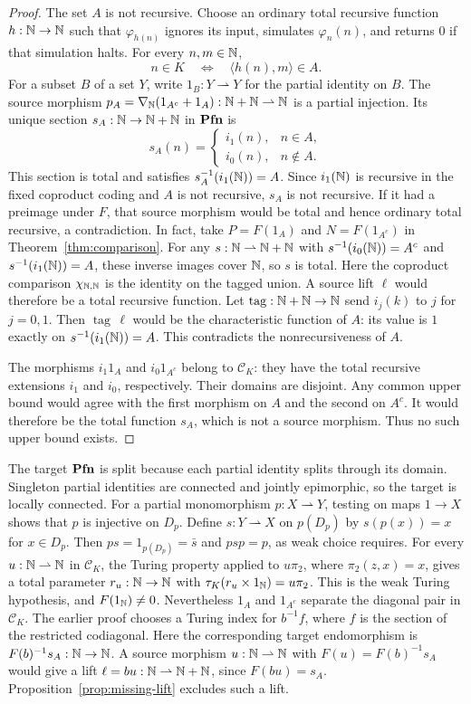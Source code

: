 \begin{proof}
The set $A$ is not recursive. Choose an ordinary
total recursive function $h:\mathbb N\to\mathbb N$ such that $\varphi_{h(n)}$
ignores its input, simulates $\varphi_n(n)$, and returns $0$ if that
simulation halts. For every $n,m\in\mathbb N$,
\[
 n\in K\quad\Longleftrightarrow\quad
 \langle h(n),m\rangle\in A.
\]
For a subset $B$ of a set $Y$, write $1_B:Y\rightharpoonup Y$ for
the partial identity on $B$. The source morphism
$p_A=\nabla_{\mathbb N}(1_{A^c}+1_A):\mathbb N+\mathbb N\rightharpoonup\mathbb N$
is a partial injection. Its unique section $s_A:\mathbb N\to\mathbb N+\mathbb N$ in $\mathbf{Pfn}$ is
\[
 s_A(n)=
 \begin{cases}
  i_1(n),&n\in A,\\
  i_0(n),&n\notin A.
 \end{cases}
\]
This section is total and satisfies $s_A^{-1}(i_1(\mathbb N))=A$.
Since $i_1(\mathbb N)$ is recursive in the fixed coproduct coding and
$A$ is not recursive, $s_A$ is not recursive.
If it had a preimage under $F$, that source morphism would
be total and hence ordinary total recursive, a contradiction.
In fact, take $P=F(1_A)$ and $N=F(1_{A^c})$ in
Theorem~\ref{thm:comparison}. For any
$s:\mathbb N\rightharpoonup\mathbb N+\mathbb N$ with
$s^{-1}(i_0(\mathbb N))=A^c$ and $s^{-1}(i_1(\mathbb N))=A$,
these inverse images cover $\mathbb N$, so $s$ is total. Here the coproduct
comparison $\chi_{\mathbb N,\mathbb N}$ is the identity on the tagged union. A source
lift $\ell$ would therefore be a total recursive function. Let
$\operatorname{tag}:\mathbb N+\mathbb N\to\mathbb N$ send $i_j(k)$ to $j$ for $j=0,1$.
Then $\operatorname{tag}\,\ell$ would be the characteristic function of
$A$: its value is $1$ exactly on $s^{-1}(i_1(\mathbb N))=A$.
This contradicts the nonrecursiveness of $A$.

The morphisms $i_1 1_A$ and $i_0 1_{A^c}$ belong to
$\mathcal C_K$: they have the total recursive extensions $i_1$
and $i_0$, respectively. Their domains are disjoint. Any common
upper bound would agree with the first morphism on $A$ and the second
on $A^c$. It would therefore be the total function $s_A$, which
is not a source morphism. Thus no such upper bound exists.
\end{proof}

The target $\mathbf{Pfn}$ is split because each partial identity splits through
its domain. Singleton partial identities are connected and jointly
epimorphic, so the target is locally connected. For a partial
monomorphism $p:X\rightharpoonup Y$, testing on maps $1\to X$
shows that $p$ is injective on $D_p$. Define $s:Y\rightharpoonup X$
on $p(D_p)$ by $s(p(x))=x$ for $x\in D_p$. Then
$ps=1_{p(D_p)}=\bar s$ and $psp=p$, as weak choice requires.
For every $u:\mathbb N\rightharpoonup\mathbb N$ in $\mathcal C_K$, the Turing
property applied to $u\pi_2$, where $\pi_2(z,x)=x$, gives a total parameter
$r_u:\mathbb N\to\mathbb N$ with $\tau_K(r_u\times1_{\mathbb N})=u\pi_2$.
This is the weak Turing hypothesis,
and $F(1_{\mathbb N})\ne0$. Nevertheless $1_A$ and $1_{A^c}$ separate
the diagonal pair in $\mathcal C_K$. The earlier proof
\cite[p.~11]{Lengyel2006} chooses a Turing index for $b^{-1}f$, where
$f$ is the section of the restricted codiagonal. Here the corresponding
target endomorphism is $F(b)^{-1}s_A:\mathbb N\to\mathbb N$. A source morphism
$u:\mathbb N\rightharpoonup\mathbb N$ with $F(u)=F(b)^{-1}s_A$ would give a lift
$\ell=bu:\mathbb N\rightharpoonup\mathbb N+\mathbb N$, since $F(bu)=s_A$.
Proposition~\ref{prop:missing-lift} excludes such a lift.
